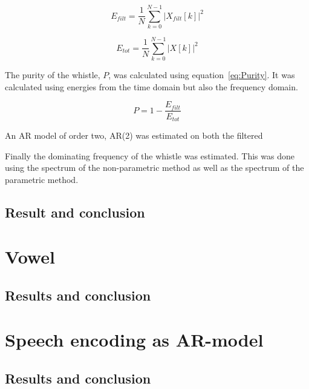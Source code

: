 \documentclass[10pt]{article}
\begin{document}
\begin{equation}
  \label{eq:Efeqfilt}
  E_{filt} =\frac{1}{N}\sum\limits_{k=0}^{N-1} |X_{filt}[k]|^2
\end{equation}

\begin{equation}
  \label{eq:Efeq}
  E_{tot} =\frac{1}{N}\sum\limits_{k=0}^{N-1} |X[k]|^2
\end{equation}

The purity of the whistle, $P$, was calculated using equation~\ref{eq:Purity}.
It was calculated using energies from the time domain but also the
frequency domain.

\begin{equation}
  \label{eq:Purity}
  P =1-\frac{E_{filt}}{E_{tot}}
\end{equation}

An AR model of order two, AR(2) was estimated on both the filtered

Finally the dominating frequency of the whistle was estimated.
This was done using the spectrum of the non-parametric method
as well as the spectrum of the parametric method.

\subsection{Result and conclusion}

\section{Vowel}
\subsection{Results and conclusion}

\section{Speech encoding as AR-model}

\subsection{Results and conclusion}
\end{document}
